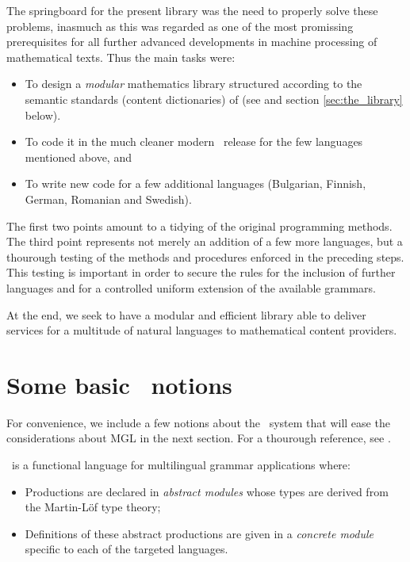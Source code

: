 \documentclass[adraft,copyright,creativecommons]{eptcs}
\begin{document}
The springboard for the present library was the need to properly solve
these problems, inasmuch as this was regarded as one of the most promissing
prerequisites for all further advanced developments in machine processing
of mathematical texts.  Thus the main tasks were:
\begin{itemize}
\item
To design a \emph{modular} mathematics library structured according to
the semantic standards (content dictionaries) of \openmath{}
(see \cite{OpenMath} and section \ref{sec:the_library} below).
\item
To code it in the much cleaner modern \GF\ release for the few languages
mentioned above, and
\item
To write new code for a few additional languages (Bulgarian, Finnish,
German, Romanian and Swedish).
\end{itemize}
The first two points amount to a tidying of the original \webalt{}
programming methods. The third point represents not merely an addition
of a few more languages, but a thourough testing of the methods and
procedures enforced in the preceding steps. This testing is important in
order to secure the rules for the inclusion of further languages and for
a controlled uniform extension of the available grammars.

At the end, we seek to have a modular and efficient library able
to deliver services for a multitude of natural languages to mathematical content providers.


\section{Some basic \GF\ notions}

For convenience, we include a few notions about the \GF\ 
system that will ease the considerations about MGL in the next section.
For a thourough reference, see \cite{Ranta11}.

\GF\ is a functional language for multilingual grammar applications where:
\begin{itemize}
	\item Productions are declared in \emph{abstract modules} whose types are derived from the Martin-L\"of type theory;
	\item Definitions of these abstract productions are given in a \emph{concrete module} specific to each of the targeted languages.
\end{itemize} 
\end{document}
